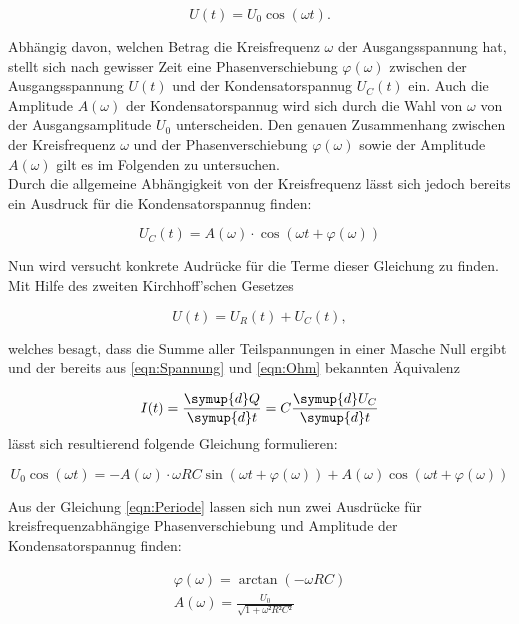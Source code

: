 \begin{equation}
    U(t) = U_0\cos(\omega t).
\end{equation}

\noindent Abhängig davon, welchen Betrag die Kreisfrequenz $\omega$ der Ausgangsspannung hat, stellt sich nach gewisser Zeit eine
Phasenverschiebung $\varphi(\omega)$ zwischen der Ausgangsspannung $U(t)$ und der Kondensatorspannug $U_C(t)$ ein. Auch
die Amplitude $A(\omega)$ der Kondensatorspannug wird sich durch die Wahl von $\omega$ von der Ausgangsamplitude $U_0$ unterscheiden.
Den genauen Zusammenhang zwischen der Kreisfrequenz $\omega$ und der Phasenverschiebung $\varphi(\omega)$ sowie der Amplitude
$A(\omega)$ gilt es im Folgenden zu untersuchen.\\
Durch die allgemeine Abhängigkeit von der Kreisfrequenz lässt sich jedoch bereits ein Ausdruck für die Kondensatorspannug finden:

\begin{equation*}
    U_C(t) = A(\omega)\cdot\cos\left(\omega t + \varphi(\omega)\right)
\end{equation*}

\noindent Nun wird versucht konkrete Audrücke für die Terme dieser Gleichung zu finden. Mit Hilfe des zweiten Kirchhoff'schen Gesetzes

\begin{equation*}
    U(t) = U_R(t) + U_C(t),
\end{equation*}

\noindent welches besagt, dass die Summe aller Teilspannungen in einer Masche Null ergibt und der bereits aus \eqref{eqn:Spannung} und \eqref{eqn:Ohm} bekannten Äquivalenz

\begin{equation*}
    I(t) = \frac{\symup{d}Q}{\symup{d}t}= C\frac{\symup{d}U_C}{\symup{d}t}
\end{equation*}
\noindent
lässt sich resultierend folgende Gleichung formulieren:

\begin{equation}
    U_0\cos(\omega t) = -A(\omega)\cdot\omega RC\sin\left(\omega t + \varphi(\omega)\right) + A(\omega)\cos\left(\omega t + \varphi(\omega)\right)
    \label{eqn:Periode}
\end{equation}

\noindent Aus der Gleichung \eqref{eqn:Periode} lassen sich nun zwei Ausdrücke für kreisfrequenzabhängige Phasenverschiebung
und Amplitude der Kondensatorspannug finden:

\begin{gather}
    \varphi(\omega) = \arctan(-\omega RC)\\
    A(\omega) = \frac{U_0}{\sqrt{1 + \omega²R²C²}}
    \label{eqn:Phase_Amplitude}
\end{gather}

